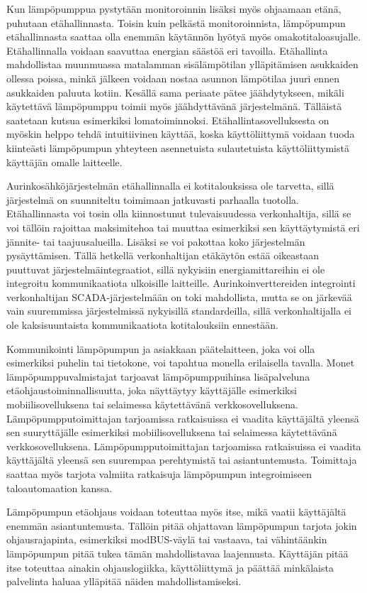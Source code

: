   Kun lämpöpumppua pystytään monitoroinnin lisäksi myös ohjaamaan etänä, puhutaan etähallinnasta. Toisin kuin pelkästä monitoroinnista, lämpöpumpun etähallinnasta saattaa olla enemmän käytännön hyötyä myös omakotitaloasujalle. Etähallinnalla voidaan saavuttaa energian säästöä eri tavoilla. Etähallinta mahdollistaa muunmuassa matalamman sisälämpötilan ylläpitämisen asukkaiden ollessa poissa, minkä jälkeen voidaan nostaa asunnon lämpötilaa juuri ennen asukkaiden paluuta kotiin. Kesällä sama periaate pätee jäähdytykseen, mikäli käytettävä lämpöpumppu toimii myös jäähdyttävänä järjestelmänä. Tälläistä saatetaan kutsua esimerkiksi lomatoiminnoksi. Etähallintasovelluksesta on myöskin helppo tehdä intuitiivinen käyttää, koska käyttöliittymä voidaan tuoda kiinteästi lämpöpumpun yhteyteen asennetuista sulautetuista käyttöliittymistä käyttäjän omalle laitteelle.

  Aurinkosähköjärjestelmän etähallinnalla ei kotitalouksissa ole tarvetta, sillä järjestelmä on suunniteltu toimimaan jatkuvasti parhaalla tuotolla. Etähallinnasta voi tosin olla kiinnostunut tulevaisuudessa verkonhaltija, sillä se voi tällöin rajoittaa maksimitehoa tai muuttaa esimerkiksi sen käyttäytymistä eri jännite- tai taajuusalueilla. Lisäksi se voi pakottaa koko järjestelmän pysäyttämisen. Tällä hetkellä verkonhaltijan etäkäytön estää oikeastaan puuttuvat järjestelmäintegraatiot, sillä nykyisiin energiamittareihin ei ole integroitu kommunikaatiota ulkoisille laitteille. Aurinkoinverttereiden integrointi verkonhaltijan \gls{SCADA}-järjestelmään on toki mahdollista, mutta se on järkevää vain suuremmissa järjestelmissä nykyisillä standardeilla, sillä verkonhaltijalla ei ole kaksisuuntaista kommunikaatiota kotitalouksiin ennestään. 

  Kommunikointi lämpöpumpun ja asiakkaan päätelaitteen, joka voi olla esimerkiksi puhelin tai tietokone, voi tapahtua monella erilaisella tavalla. Monet lämpöpumppuvalmistajat tarjoavat lämpöpumppuihinsa lisäpalveluna etäohjaustoiminnallisuutta, joka näyttäytyy käyttäjälle esimerkiksi mobiilisovelluksena tai selaimessa käytettävänä verkkosovelluksena. Lämpöpumpputoimittajan tarjoamissa ratkaisuissa ei vaadita käyttäjältä yleensä sen suuryttäjälle esimerkiksi mobiilisovelluksena tai selaimessa käytettävänä verkkosovelluksena. Lämpöpumpputoimittajan tarjoamissa ratkaisuissa ei vaadita käyttäjältä yleensä sen suurempaa perehtymistä tai asiantuntemusta. Toimittaja saattaa myös tarjota valmiita ratkaisuja lämpöpumpun integroimiseen taloautomaation kanssa.

  Lämpöpumpun etäohjaus voidaan toteuttaa myös itse, mikä vaatii käyttäjältä enemmän asiantuntemusta. Tällöin pitää ohjattavan lämpöpumpun tarjota jokin ohjausrajapinta, esimerkiksi modBUS-väylä tai vastaava, tai vähintäänkin lämpöpumpun pitää tukea tämän mahdollistavaa laajennusta. Käyttäjän pitää itse toteuttaa ainakin ohjauslogiikka, käyttöliittymä ja päättää minkälaista palvelinta haluaa ylläpitää näiden mahdollistamiseksi.

